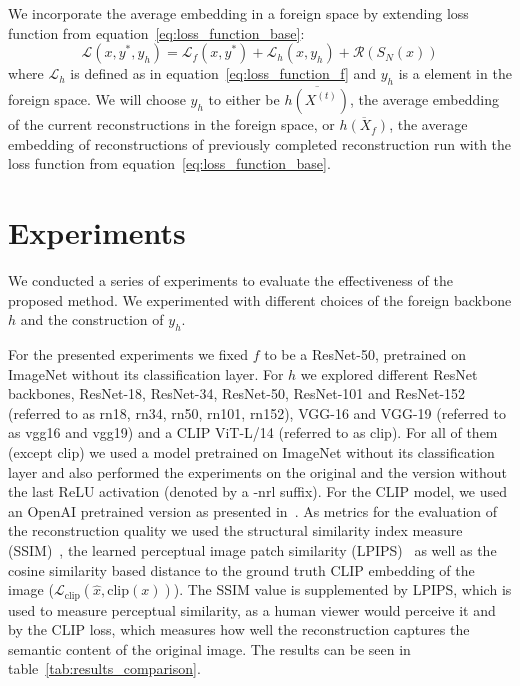 \documentclass[10pt,twocolumn]{article}
\begin{document}
We incorporate the average embedding in a foreign space by extending loss function from equation~\ref{eq:loss_function_base}:
\begin{equation}\label{eq:loss_function}
\mathcal{L}(x, y^*, y_h) = \mathcal{L}_{f}(x, y^*) + \mathcal{L}_{h}(x, y_h) + \mathcal{R}(S_N(x))
\end{equation}
where $\mathcal{L}_{h}$ is defined as in equation~\ref{eq:loss_function_f} and $y_h$ is a element in the foreign space.
We will choose $y_h$ to either be $\overline{h(X^{(t)})}$, the average embedding of the current reconstructions in the foreign space, or $\overline{h(X_f)}$, the average embedding of reconstructions of previously completed reconstruction run with the loss function from equation~\ref{eq:loss_function_base}.

\section{Experiments}
We conducted a series of experiments to evaluate the effectiveness of the proposed method.
We experimented with different choices of the foreign backbone $h$ and the construction of $y_h$.

For the presented experiments we fixed $f$ to be a ResNet-50, pretrained on ImageNet without its classification layer.
For $h$ we explored different ResNet backbones, ResNet-18, ResNet-34, ResNet-50, ResNet-101 and ResNet-152 (referred to as rn18, rn34, rn50, rn101, rn152), VGG-16 and VGG-19 (referred to as vgg16 and vgg19) and a CLIP ViT-L/14 (referred to as clip).
For all of them (except clip) we used a model pretrained on ImageNet without its classification layer and also performed the experiments on the original and the version without the last ReLU activation (denoted by a -nrl suffix).
For the CLIP model, we used an OpenAI pretrained version as presented in~\cite{radfordLearningTransferableVisual2021}.
As metrics for the evaluation of the reconstruction quality we used the structural similarity index measure (SSIM)~\cite{zhouwangImageQualityAssessment2004}, the learned perceptual image patch similarity (LPIPS)~\cite{zhangUnreasonableEffectivenessDeep2018} as well as the cosine similarity based distance to the ground truth CLIP embedding of the image ($\mathcal{L}_{\text{clip}}(\hat x, \text{clip}(x))$).
The SSIM value is supplemented by LPIPS, which is used to measure perceptual similarity, as a human viewer would perceive it and by the CLIP loss, which measures how well the reconstruction captures the semantic content of the original image.
The results can be seen in table~\ref{tab:results_comparison}.
\end{document}
